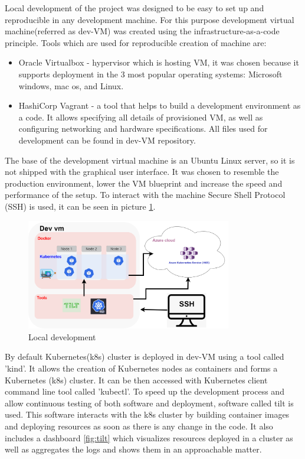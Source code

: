 Local development of the project was designed to be easy to set up and reproducible in any development machine. For this purpose development virtual machine(referred as dev-VM) was created using the infrastructure-as-a-code principle. Tools which are used for reproducible creation of machine are:
\begin{itemize}
    \item Oracle Virtualbox\cite{virtual_box} - hypervisor which is hosting VM, it was chosen because it supports deployment in the 3 most popular operating systems: Microsoft windows, mac os, and Linux.
    \item HashiCorp Vagrant\cite{vagrant} - a tool that helps to build a development environment as a code. It allows specifying all details of provisioned VM, as well as configuring networking and hardware specifications. All files used for development can be found in dev-VM repository\cite{dev_vm}.
\end{itemize}

The base of the development virtual machine is an Ubuntu Linux server, so it is not shipped with the graphical user interface. It was chosen to resemble the production environment, lower the VM blueprint and increase the speed and performance of the setup. To interact with the machine Secure Shell Protocol (SSH) is used, it can be seen in picture \ref{fig:local_development}.

\begin{figure}[H]
    \centering
    \includegraphics[width=0.8\textwidth]{pictures/development_setup.png}
    \caption{ Local development }
    \label{fig:local_development}
\end{figure}

By default Kubernetes(k8s) cluster is deployed in dev-VM using a tool called 'kind'. It allows the creation of Kubernetes nodes as containers and forms a Kubernetes (k8s) cluster. It can be then accessed with Kubernetes client command line tool called 'kubectl'. To speed up the development process and allow continuous testing of both software and deployment, software called tilt is used. This software interacts with the k8s cluster by building container images and deploying resources as soon as there is any change in the code. It also includes a dashboard \ref{fig:tilt} which visualizes resources deployed in a cluster as well as aggregates the logs and shows them in an approachable matter.


